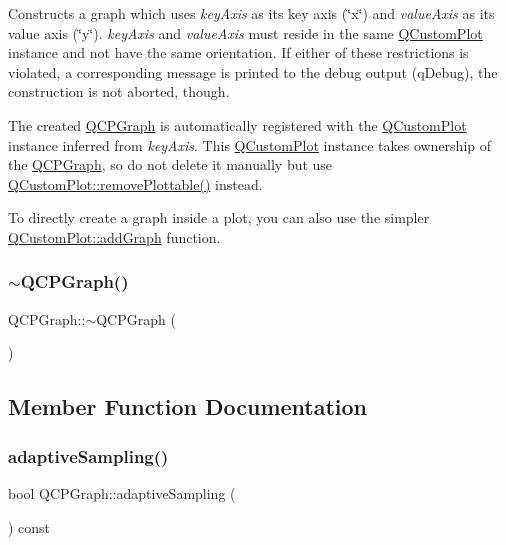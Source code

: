 Constructs a graph which uses {\itshape key\+Axis} as its key axis (\char`\"{}x\char`\"{}) and {\itshape value\+Axis} as its value axis (\char`\"{}y\char`\"{}). {\itshape key\+Axis} and {\itshape value\+Axis} must reside in the same \hyperlink{class_q_custom_plot}{Q\+Custom\+Plot} instance and not have the same orientation. If either of these restrictions is violated, a corresponding message is printed to the debug output (q\+Debug), the construction is not aborted, though.

The created \hyperlink{class_q_c_p_graph}{Q\+C\+P\+Graph} is automatically registered with the \hyperlink{class_q_custom_plot}{Q\+Custom\+Plot} instance inferred from {\itshape key\+Axis}. This \hyperlink{class_q_custom_plot}{Q\+Custom\+Plot} instance takes ownership of the \hyperlink{class_q_c_p_graph}{Q\+C\+P\+Graph}, so do not delete it manually but use \hyperlink{class_q_custom_plot_af3dafd56884208474f311d6226513ab2}{Q\+Custom\+Plot\+::remove\+Plottable()} instead.

To directly create a graph inside a plot, you can also use the simpler \hyperlink{class_q_custom_plot_a6fb2873d35a8a8089842d81a70a54167}{Q\+Custom\+Plot\+::add\+Graph} function. \mbox{\label{class_q_c_p_graph_ae9998cfb9d379ac0ef3fbd6995cfbd76}} 
\subsubsection{\texorpdfstring{$\sim$\+Q\+C\+P\+Graph()}{~QCPGraph()}}
{\footnotesize\ttfamily Q\+C\+P\+Graph\+::$\sim$\+Q\+C\+P\+Graph (\begin{DoxyParamCaption}{ }\end{DoxyParamCaption})\hspace{0.3cm}{\ttfamily [virtual]}}



\subsection{Member Function Documentation}
\mbox{\label{class_q_c_p_graph_a1ba934b9621270b9a40fcdd2d9ba2adb}} 
\subsubsection{\texorpdfstring{adaptive\+Sampling()}{adaptiveSampling()}}
{\footnotesize\ttfamily bool Q\+C\+P\+Graph\+::adaptive\+Sampling (\begin{DoxyParamCaption}{ }\end{DoxyParamCaption}) const\hspace{0.3cm}{\ttfamily [inline]}}

